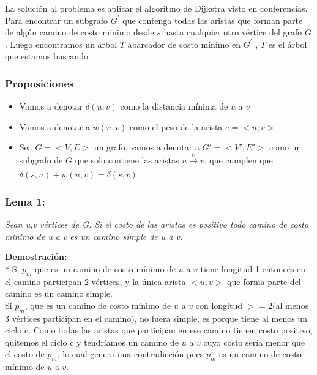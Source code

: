 \documentclass{article}
\begin{document}
    \noindent La soluci\'on al problema es aplicar el algoritmo de  Dijkstra visto en conferencias.
    Para encontrar un subgrafo $G^{'}$ que contenga todas las aristas que forman parte de alg\'un camino de 
    costo minimo desde $s$ hasta cualquier otro v\'ertice del grafo $G$. Luego encontramos un \'arbol $T$ abarcador de 
    costo m\'inimo en $G^{'}$ , $T$ es el \'arbol que estamos buscando 


    
    \subsubsection{Proposiciones }
    \begin{itemize}
        \item Vamos a denotar $\delta\left(u,v\right)$ como la distancia m\'inima de $u$ a $v$ 
        \item Vamos a denotar a $w(u,v)$ como el peso de la arista $e= <u,v>$ 
        \item Sea $G = <V,E>$ un grafo, vamos a denotar a $G' = <V',E'>$ como un subgrafo de $G$ que solo contiene las aristas $ u \xrightarrow[]{e} v$, 
        que cumplen que $\delta\left(s,u\right) + w \left(u,v\right) = \delta\left(s,v\right)$   
    \end{itemize}

    \subsubsection{Lema 1:}

    \textit{Sean u,v v\'ertices de G. Si el costo de las aristas es positivo todo camino de costo m\'inimo de u a v es un camino simple de u a v.}
    
    \vspace*{0.3cm} 

    
    \noindent \textbf{Demostraci\'on:}
    \\*
    Si $p_{m}$ que es un camino de costo m\'inimo de $u$ a $v$ tiene longitud 1 entonces en el camino participan 2 v\'ertices, y la \'unica arista $<u,v>$
    que forma parte del camino es un camino simple.\\ 
    Si $p_{m}$, que es un camino de costo m\'inimo de $u$ a $v$ con longitud $>=2$$($al menos 3 v\'ertices participan en el camino$)$, no fuera simple, es 
    porque tiene al menos un ciclo c. Como todas las aristas que participan en ese camino tienen costo positivo, quitemos el ciclo c y tendr\'iamos 
    un camino de $u$ a $v$ cuyo costo ser\'ia menor que el costo de $p_{m}$, lo cual genera
    una contradicci\'on pues $p_{m}$ es un camino de costo m\'inimo de $u$ a $v$.\\
    
\end{document}
